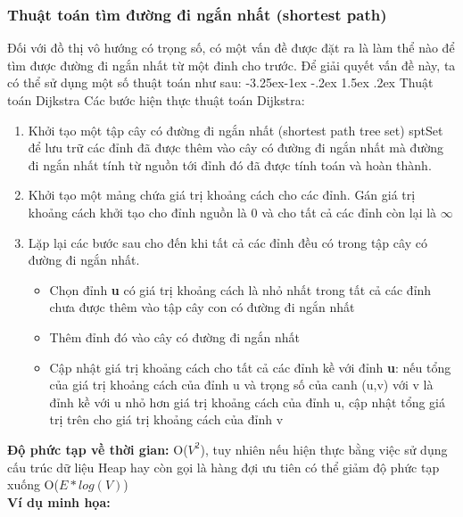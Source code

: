 \documentclass[a4paper]{article}
\makeatletter
\newcounter {subsubsubsection}[subsubsection]
\newcommand\subsubsubsection{\@startsection{subsubsubsection}{4}{\z@}%
                                     {-3.25ex\@plus -1ex \@minus -.2ex}%
                                     {1.5ex \@plus .2ex}%
                                     {\normalfont\normalsize\bfseries}}
\makeatother
\begin{document}
\subsubsection{Thuật toán tìm đường đi ngắn nhất (shortest path)}
        Đối với đồ thị vô hướng có trọng số, có một vấn đề được đặt ra là làm thể nào để tìm được đường đi ngắn nhất từ một đinh cho trước. Để giải quyết vấn đề này, ta có thể sử dụng một số thuật toán như sau:
            \subsubsubsection{Thuật toán Dijkstra}
Các bước hiện thực thuật toán Dijkstra:
\begin{enumerate}
    \item Khởi tạo một tập cây có đường đi ngắn nhất (shortest path tree set) sptSet để lưu trữ các đỉnh đã được thêm vào cây có đường đi ngắn nhất mà đường đi ngắn nhất tính từ nguồn tới đỉnh đó đã được tính toán và hoàn thành.
    \item Khởi tạo một mảng chứa giá trị khoảng cách cho các đỉnh. Gán giá trị khoảng cách khởi tạo cho đỉnh nguồn là 0 và cho tất cả các đỉnh còn lại là \textbf{$\infty$}
    \item Lặp lại các bước sau cho đến khi tất cả các đỉnh đều có trong tập cây có đường đi ngắn nhất. 
    \begin{itemize}
        \item Chọn đỉnh \textbf{u} có giá trị khoảng cách là nhỏ nhất trong tất cả các đỉnh chưa được thêm vào tập cây con có đường đi ngắn nhất
        \item Thêm đỉnh đó vào cây có đường đi ngắn nhất
        \item Cập nhật giá trị khoảng cách cho tất cả các đỉnh kề với đỉnh \textbf{u}: nếu tổng của giá trị khoảng cách của đỉnh u và trọng số của canh (u,v) với v là đỉnh kề với u nhỏ hơn giá trị khoảng cách của đỉnh u, cập nhật tổng giá trị trên cho giá trị khoảng cách của đỉnh v
    \end{itemize}
\end{enumerate}
\textbf{Độ phức tạp về thời gian:} O($V^2$), tuy nhiên nếu hiện thực bằng việc sử dụng cấu trúc dữ liệu Heap hay còn gọi là hàng đợi ưu tiên có thể giảm độ phức tạp xuống O($E*log(V)$)  \\

\textbf{Ví dụ minh họa:} \\
\end{document}
